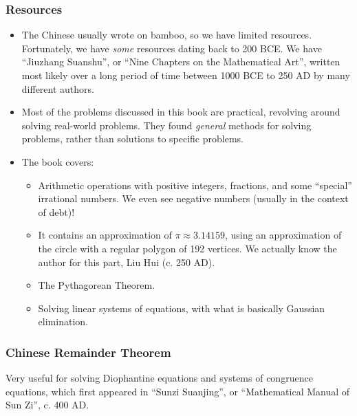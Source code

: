 \documentclass[class=article, crop=false]{standalone}
\begin{document}
  \subsubsection{Resources}
  \begin{itemize}
    \item The Chinese usually wrote on bamboo, so we have limited resources. Fortunately, we have \emph{some} resources dating back to 200 BCE. We have ``Jiuzhang Suanshu'', or ``Nine Chapters on the Mathematical Art'', written most likely over a long period of time between 1000 BCE to 250 AD by many different authors.
    \item Most of the problems discussed in this book are practical, revolving around solving real-world problems. They found \emph{general} methods for solving problems, rather than solutions to specific problems.
    \item The book covers:
    \begin{itemize}
      \item Arithmetic operations with positive integers, fractions, and some ``special'' irrational numbers. We even see negative numbers (usually in the context of debt)!
      \item It contains an approximation of $\pi \approx 3.14159$, using an approximation of the circle with a regular polygon of 192 vertices. We actually know the author for this part, Liu Hui (c. 250 AD).
      \item The Pythagorean Theorem.
      \item Solving linear systems of equations, with what is basically Gaussian elimination.
    \end{itemize}
  \end{itemize}
  \subsubsection{Chinese Remainder Theorem}
  Very useful for solving Diophantine equations and systems of congruence equations, which first appeared in ``Sunzi Suanjing'', or ``Mathematical Manual of Sun Zi'', c. 400 AD.
\end{document}
